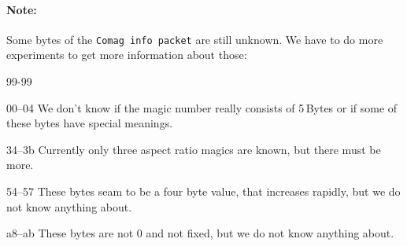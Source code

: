 \documentclass{scrartcl}
\begin{document}
\paragraph{Note:} Some bytes of the \texttt{Comag info packet} are still
unknown. We have to do more experiments to get more information about those:
\begin{labeling}[:]{99-99}
\item[00--04] We don't know if the magic number really consists of 5\,Bytes or
  if some of these bytes have special meanings.
\item[34--3b] Currently only three aspect ratio magics are known, but there
  must be more.
\item[54--57] These bytes seam to be a four byte value, that increases
  rapidly, but we do not know anything about.
\item[a8--ab] These bytes are not 0 and not fixed, but we do not know anything
  about. 
\end{labeling}
\end{document}
